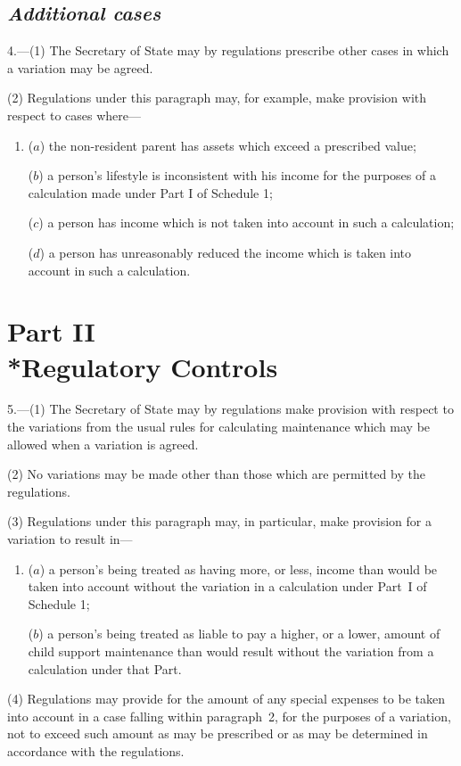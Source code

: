 \documentclass[12pt,a4paper]{article}
\begin{document}
\subsection*{\itshape Additional cases}

4.---(1) The Secretary of State may by regulations prescribe other cases in which a variation may be agreed.

(2) Regulations under this paragraph may, for example, make provision with respect to cases where—
\begin{enumerate}\item[]
($a$) the non-resident parent has assets which exceed a prescribed value;

($b$) a person’s lifestyle is inconsistent with his income for the purposes of a calculation made under Part I of Schedule 1;

($c$) a person has income which is not taken into account in such a calculation;

($d$) a person has unreasonably reduced the income which is taken into account in such a calculation.
\end{enumerate}

\section[Part II --- Regulatory Controls]{Part II\\*Regulatory Controls}

5.---(1) The Secretary of State may by regulations make provision with respect to the variations from the usual rules for calculating maintenance which may be allowed when a variation is agreed.

(2) No variations may be made other than those which are permitted by the regulations.

(3) Regulations under this paragraph may, in particular, make provision for a variation to result in—
\begin{enumerate}\item[]
($a$) a person’s being treated as having more, or less, income than would be taken into account without the variation in a calculation under Part~I of Schedule 1;

($b$) a person’s being treated as liable to pay a higher, or a lower, amount of child support maintenance than would result without the variation from a calculation under that Part.
\end{enumerate}

(4) Regulations may provide for the amount of any special expenses to be taken into account in a case falling within paragraph~2, for the purposes of a variation, not to exceed such amount as may be prescribed or as may be determined in accordance with the regulations.
\end{document}
